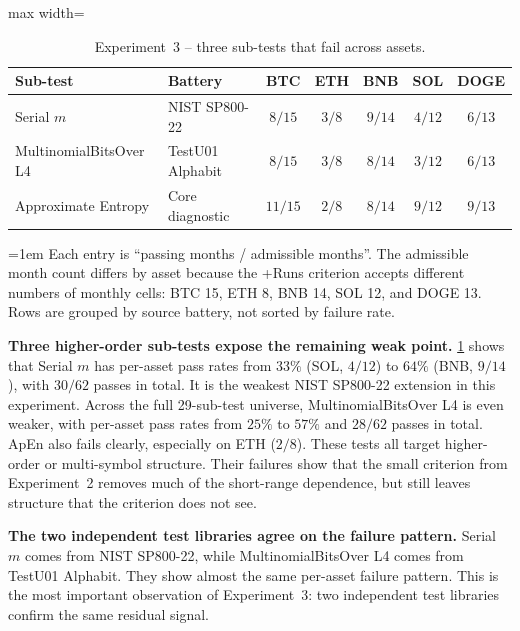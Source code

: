 \documentclass[11pt,titlepage,openany,oneside]{book}  %
\newcommand{\floatnote}[1]{%
  \par\smallskip\noindent%
  \begin{minipage}{\linewidth}%
    \footnotesize\emergencystretch=1em #1%
  \end{minipage}\par%
}
\begin{document}
\begin{table}[!htbp]
  \caption{Experiment~3 -- three sub-tests that fail across assets.}
  \label{tab:exp3-failing-subtests}
  \begin{center}
    \begin{adjustbox}{max width=\textwidth}
    \begin{tabular}{llccccc}
      \toprule
      Sub-test & Battery & BTC & ETH & BNB & SOL & DOGE \\
      \midrule
      Serial $m$             & NIST SP800-22    & $8/15$  & $3/8$ & $9/14$ & $4/12$ & $6/13$ \\
      MultinomialBitsOver L4 & TestU01 Alphabit & $8/15$  & $3/8$ & $8/14$ & $3/12$ & $6/13$ \\
      Approximate Entropy    & Core diagnostic  & $11/15$ & $2/8$ & $8/14$ & $9/12$ & $9/13$ \\
      \bottomrule
    \end{tabular}
    \end{adjustbox}
  \end{center}
  \floatnote{Each entry is ``passing months / admissible months''. The admissible month count differs by asset because the +Runs criterion accepts different numbers of monthly cells: BTC 15, ETH 8, BNB 14, SOL 12, and DOGE 13. Rows are grouped by source battery, not sorted by failure rate.}
\end{table}

\textbf{Three higher-order sub-tests expose the remaining weak point.} \cref{tab:exp3-failing-subtests} shows that Serial $m$ has per-asset pass rates from $33\%$ (SOL, $4/12$) to $64\%$ (BNB, $9/14$), with $30/62$ passes in total. It is the weakest NIST SP800-22 extension in this experiment. Across the full 29-sub-test universe, MultinomialBitsOver L4 is even weaker, with per-asset pass rates from $25\%$ to $57\%$ and $28/62$ passes in total. ApEn also fails clearly, especially on ETH ($2/8$). These tests all target higher-order or multi-symbol structure. Their failures show that the small criterion from Experiment~2 removes much of the short-range dependence, but still leaves structure that the criterion does not see.

\textbf{The two independent test libraries agree on the failure pattern.} Serial $m$ comes from NIST SP800-22, while MultinomialBitsOver L4 comes from TestU01 Alphabit. They show almost the same per-asset failure pattern. This is the most important observation of Experiment~3: two independent test libraries confirm the same residual signal.
\end{document}
